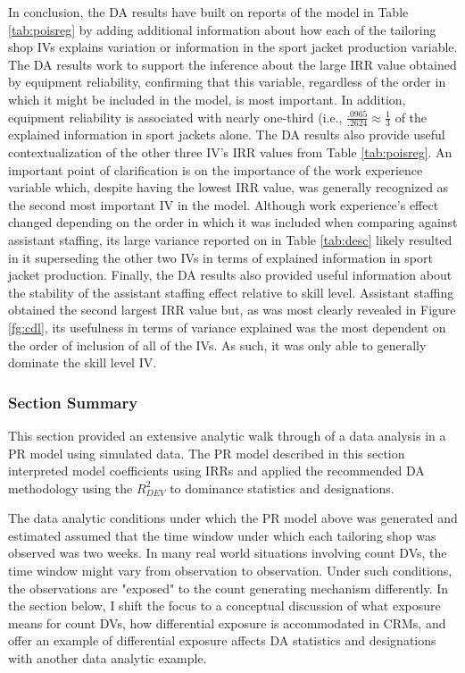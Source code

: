 \documentclass[ShortAfour,times,sageapa]{sagej}
\begin{document}
	In conclusion, the DA results have built on reports of the model in Table \ref{tab:poisreg} by adding additional information about how each of the tailoring shop IVs explains variation or information in the sport jacket production variable. 
	The DA results work to support the inference about the large IRR value obtained by equipment reliability, confirming that this variable, regardless of the order in which it might be included in the model, is most important. 
	In addition, equipment reliability is associated with nearly one-third (i.e., $\frac{.0965}{.2624} \approx \frac{1}{3}$ of the explained information in sport jackets alone.
	The DA results also provide useful contextualization of the other three IV's IRR values from Table \ref{tab:poisreg}. 
	An important point of clarification is on the importance of the work experience variable which, despite having the lowest IRR value, was generally recognized as the second most important IV in the model.
	Although work experience's effect changed depending on the order in which it was included when comparing against assistant staffing, its large variance reported on in Table \ref{tab:desc} likely resulted in it superseding the other two IVs in terms of explained information in sport jacket production.
	Finally, the DA results also provided useful information about the stability of the assistant staffing effect relative to skill level.
	Assistant staffing obtained the second largest IRR value but, as was most clearly revealed in Figure \ref{fg:cdl}, its usefulness in terms of variance explained was the most dependent on the order of inclusion of all of the IVs.
	As such, it was only able to generally dominate the skill level IV.

	\subsubsection{Section Summary}
	
	This section provided an extensive analytic walk through of a data analysis in a PR model using simulated data.
	The PR model described in this section interpreted model coefficients using IRRs and applied the recommended DA methodology using the $R^2_{DEV}$ to dominance statistics and designations.
	
	The data analytic conditions under which the PR model above was generated and estimated assumed that the time window under which each tailoring shop was observed was two weeks.
	In many real world situations involving count DVs, the time window might vary from observation to observation. 
	Under such conditions, the observations are "exposed" to the count generating mechanism differently.
	In the section below, I shift the focus to a conceptual discussion of what exposure means for count DVs, how differential exposure is accommodated in CRMs, and offer an example of differential exposure affects DA statistics and designations with another data analytic example.
	
\end{document}
